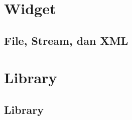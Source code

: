 \documentclass[11pt,b5paper,oneside,titlepage]{book}
\begin{document}
	\part{Widget}
	
	\chapter{File, Stream, dan XML}\label{file-stream-dan-xml}
		
		
%		
	\part{Library}
	\chapter{Library}
	
	
	\backmatter
	
	
	\printindex
\end{document}

